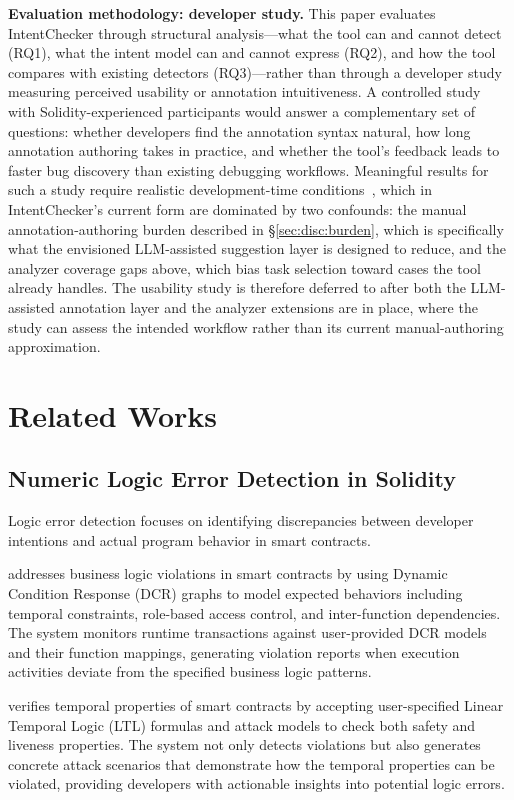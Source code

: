 \documentclass[pdflatex,sn-basic]{sn-jnl}%
\theoremstyle{thmstyleone}%
\theoremstyle{thmstyletwo}%
\theoremstyle{thmstylethree}%
\begin{document}
\smallskip
\noindent\textbf{Evaluation methodology: developer study.}
This paper evaluates IntentChecker through structural analysis---what the tool can and cannot detect (RQ1), what the intent model can and cannot express (RQ2), and how the tool compares with existing detectors (RQ3)---rather than through a developer study measuring perceived usability or annotation intuitiveness.
A controlled study with Solidity-experienced participants would answer a complementary set of questions: whether developers find the annotation syntax natural, how long annotation authoring takes in practice, and whether the tool's feedback leads to faster bug discovery than existing debugging workflows.
Meaningful results for such a study require realistic development-time conditions~\citep{defisecurity}, which in IntentChecker's current form are dominated by two confounds: the manual annotation-authoring burden described in \S\ref{sec:disc:burden}, which is specifically what the envisioned LLM-assisted suggestion layer is designed to reduce, and the analyzer coverage gaps above, which bias task selection toward cases the tool already handles.
The usability study is therefore deferred to after both the LLM-assisted annotation layer and the analyzer extensions are in place, where the study can assess the intended workflow rather than its current manual-authoring approximation.

\section{Related Works}\label{sec:related}
\subsection{Numeric Logic Error Detection in Solidity}
Logic error detection focuses on identifying discrepancies between developer intentions and actual program behavior in smart contracts.

\citep{highguard} addresses business logic violations in smart contracts by using Dynamic Condition Response (DCR) graphs
to model expected behaviors including temporal constraints, role-based access control, and inter-function dependencies.
The system monitors runtime transactions against user-provided DCR models and their function mappings,
generating violation reports when execution activities deviate from the specified business logic patterns.

\citep{smartpulse} verifies temporal properties of smart contracts by accepting user-specified Linear Temporal Logic (LTL) formulas
and attack models to check both safety and liveness properties.
The system not only detects violations but also generates concrete attack scenarios that demonstrate how the temporal properties can be violated,
providing developers with actionable insights into potential logic errors.
\end{document}
